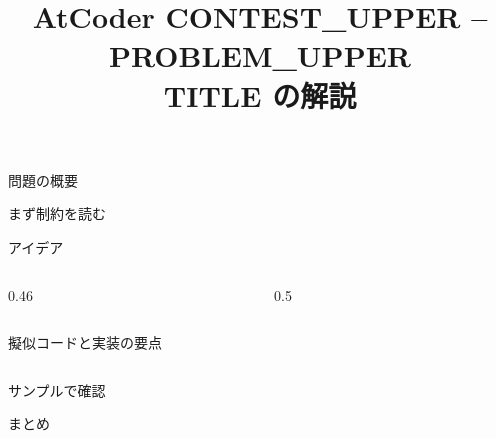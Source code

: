 \documentclass[dvipdfmx,aspectratio=169]{beamer}
\title[{{CONTEST_UPPER}} {{PROBLEM_UPPER}}]{AtCoder {{CONTEST_UPPER}} -- {{PROBLEM_UPPER}}\\\small {{TITLE}} の解説}
\author[{{CONTEST}}]{}
\institute{}
\date{}
\begin{document}
\begin{frame}
  \titlepage
\end{frame}

\begin{frame}{問題の概要}
\end{frame}

\begin{frame}{まず制約を読む}
\end{frame}

\begin{frame}{アイデア}
  \begin{columns}
    \begin{column}{0.46\textwidth}
      \centering
      \begin{tikzpicture}
      \end{tikzpicture}

    \end{column}
    \begin{column}{0.5\textwidth}
    \end{column}
  \end{columns}
\end{frame}

\begin{frame}[fragile]{擬似コードと実装の要点}
  \begin{verbatim}
  \end{verbatim}
\end{frame}

\begin{frame}{サンプルで確認}
\end{frame}

\begin{frame}[fragile]{まとめ}
\end{frame}
\end{document}

